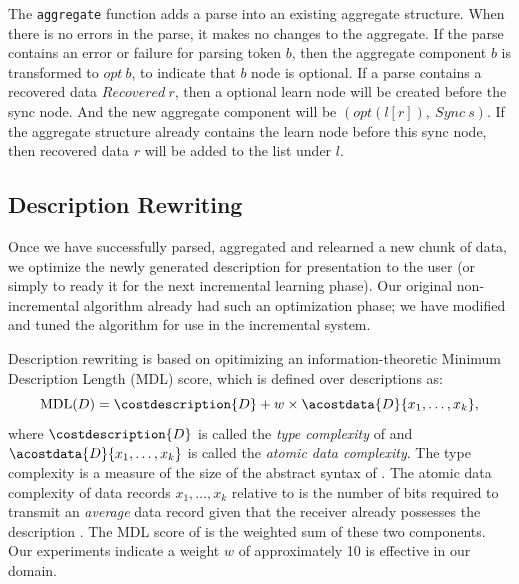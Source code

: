 {The {\tt aggregate} function adds a parse into an existing aggregate structure. When there is
no errors in the parse, it makes no changes to the aggregate. If the parse contains 
an error or failure for parsing token $b$, then the aggregate component 
$b$ is transformed to $opt~ b$, to indicate that $b$ node is optional. 
If a parse contains a recovered data $Recovered~ r$, then
a optional learn node will be created before the sync node. And the new aggregate component will be
$(opt (l [r]),~ Sync~ s)$. If the aggregate structure already contains the learn node before this
sync node, then recovered data $r$ will be added to the list under $l$.


}%



\subsection{Description Rewriting}
Once we have successfully parsed, aggregated and relearned a new
chunk of data, we optimize the newly generated description for
presentation to the user (or simply to ready it for the next incremental
learning phase).  Our original non-incremental
algorithm already had such an optimization
phase; we have modified and tuned the algorithm for use in
the incremental system.

Description rewriting is based on opitimizing an information-theoretic
Minimum Description Length (MDL) score, which is defined over descriptions
 as:
\[\mbox{\rm{MDL}}(D) = \costdescription{D} + w \times \acostdata{D}{x_1, \ldots, x_k},\]
where $\costdescription{D}$ is called the {\em type complexity} of 
and $\acostdata{D}{x_1, \ldots, x_k}$ is called the {\em atomic data 
complexity}.  The type complexity is a measure of the size of the 
abstract syntax of .  The atomic data 
complexity of  data records $x_1, \ldots, x_k$ relative to  
is the number of bits required
to transmit an {\em average} data record given that 
the receiver already possesses the description .
The MDL score of  is the weighted sum of these two components.  
Our experiments indicate a weight $w$ of approximately 10 is effective
in our domain.

